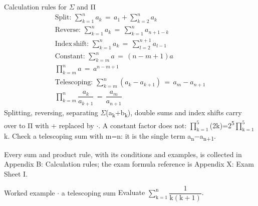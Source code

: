 \documentclass[11pt]{article}
\begin{document}
\begin{keepsection}
\begin{equationcard}{Calculation rules for \ensuremath{\Sigma} and Π}
\[ \begin{gathered} \text{Split}:\, \sum_{{k}=1}^{{n}} {a}_{{k}}\, =\, {a}_{1}+\sum_{{k}=2}^{{n}} {a}_{{k}} \\ \text{Reverse}:\, \sum_{{k}=1}^{{n}} {a}_{{k}}\, =\, \sum_{{k}=1}^{{n}} {a}_{{n}+1-{k}} \\ \text{Index}\, \text{shift}:\, \sum_{{k}=1}^{{n}} {a}_{{k}}\, =\, \sum_{{l}=2}^{{n}+1} {a}_{{l}-1} \\ \text{Constant}:\, \sum_{{k}={m}}^{{n}} {a}\, =\, ({n}-{m}+1){a} \\ \prod_{{k}={m}}^{{n}} {a}\, =\, {a}^{{n}-{m}+1} \\ \text{Telescoping}:\, \sum_{{k}={m}}^{{n}} ({a}_{{k}}-{a}_{{k}+1})\, =\, {a}_{{m}}-{a}_{{n}+1} \\ \prod_{{k}={m}}^{{n}} \dfrac{{a}_{{k}}}{{a}_{{k}+1}}\, =\, \dfrac{{a}_{{m}}}{{a}_{{n}+1}} \end{gathered} \]
{\small Splitting, reversing, separating \ensuremath{\Sigma}(a\textsubscript{k}+b\textsubscript{k}), double sums and index shifts carry over to Π with + replaced by \ensuremath{\cdot}. A constant factor does not: $\prod_{\mathrm{k}=1}^{5} $(2k)=2\textsuperscript{5}$\prod_{\mathrm{k}=1}^{5} $k. Check a telescoping sum with m=n: it is the single term a\textsubscript{n}\ensuremath{-}a\textsubscript{n+1}.}
\end{equationcard}

\begin{notebox}Every sum and product rule, with its conditions and examples, is collected in Appendix B: Calculation rules; the exam formula reference is Appendix X: Exam Sheet I.\end{notebox}

\begin{workedbox}{Worked example \ensuremath{\cdot} a telescoping sum}
Evaluate $\sum_{\mathrm{k}=1}^{\mathrm{n}} ${\small\ensuremath{\dfrac{1}{\mathrm{k}(\mathrm{k}+1)}}}.


\end{workedbox}
\end{keepsection}
\end{document}
